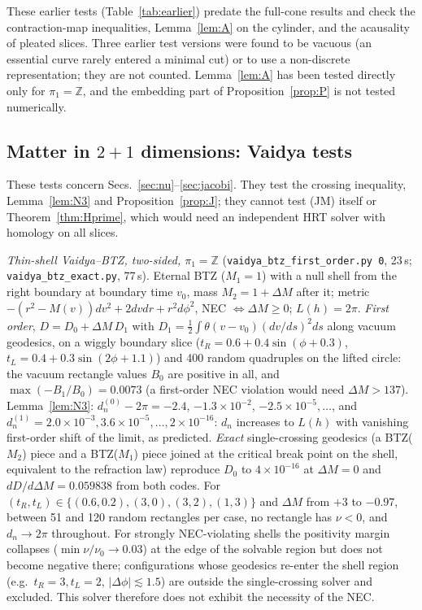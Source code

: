 \documentclass[aps,prd,onecolumn,superscriptaddress,nofootinbib,amsmath,amssymb,11pt]{revtex4-2}
\theoremstyle{definition}
\newcommand{\Z}{\mathbb{Z}}
\begin{document}
These earlier tests (Table~\ref{tab:earlier}) predate the full-cone results and check the contraction-map inequalities, Lemma~\ref{lem:A}
on the cylinder, and the acausality of pleated slices. Three earlier test versions were found to be vacuous (an essential curve
rarely entered a minimal cut) or to use a non-discrete representation; they are not counted. Lemma~\ref{lem:A} has been tested
directly only for $\pi_1=\Z$, and the embedding part of Proposition~\ref{prop:P} is not tested numerically.

\subsection{Matter in $2+1$ dimensions: Vaidya tests}\label{sec:numvaidya3}

These tests concern Secs.~\ref{sec:nu}--\ref{sec:jacobi}. They test the crossing inequality, Lemma~\ref{lem:N3} and
Proposition~\ref{prop:J}; they cannot test (JM) itself or Theorem~\ref{thm:Hprime}, which would need an independent HRT
solver with homology on all slices.

\begin{sloppypar}
\emph{Thin-shell Vaidya--BTZ, two-sided, $\pi_1=\Z$} (\texttt{vaidya\_btz\_first\_order.py 0}, 23\,s; \texttt{vaidya\_btz\_exact.py},
77\,s). Eternal BTZ ($M_1=1$) with a null shell from the right boundary at boundary time $v_0$, mass $M_2=1+\Delta M$ after it;
metric $-(r^2-M(v))dv^2+2dvdr+r^2d\phi^2$, NEC $\Leftrightarrow\Delta M\ge0$; $L(h)=2\pi$. \emph{First order}, $D=D_0+\Delta M\,D_1$ with
$D_1=\frac12\int\theta(v-v_0)(dv/ds)^2ds$ along vacuum geodesics, on a wiggly boundary slice ($t_R=0.6+0.4\sin(\phi+0.3)$,
$t_L=0.4+0.3\sin(2\phi+1.1)$) and 400 random quadruples on the lifted circle: the vacuum rectangle values $B_0$ are positive in all, and
$\max(-B_1/B_0)=0.0073$ (a first-order NEC violation would need $\Delta M>137$). Lemma~\ref{lem:N3}: $d^{(0)}_n-2\pi=-2.4$,
$-1.3\times10^{-2}$, $-2.5\times10^{-5},\dots$, and $d^{(1)}_n=2.0\times10^{-3},3.6\times10^{-5},\dots,2\times10^{-16}$: $d_n$ increases to
$L(h)$ with vanishing first-order shift of the limit, as predicted. \emph{Exact} single-crossing geodesics (a BTZ($M_2$) piece and a
BTZ($M_1$) piece joined at the critical break point on the shell, equivalent to the refraction law) reproduce $D_0$ to
$4\times10^{-16}$ at $\Delta M=0$ and $dD/d\Delta M=0.059838$ from both codes. For $(t_R,t_L)\in\{(0.6,0.2),(3,0),(3,2),(1,3)\}$ and
$\Delta M$ from $+3$ to $-0.97$, between 51 and 120 random rectangles per case, no rectangle has $\nu<0$, and $d_n\to2\pi$ throughout. For
strongly NEC-violating shells the positivity margin collapses ($\min\nu/\nu_0\to0.03$) at the edge of the solvable region but does not
become negative there; configurations whose geodesics re-enter the shell region (e.g.\ $t_R=3,t_L=2$, $|\Delta\phi|\lesssim1.5$) are
outside the single-crossing solver and excluded. This solver therefore does not exhibit the necessity of the NEC.
\end{sloppypar}
\end{document}

